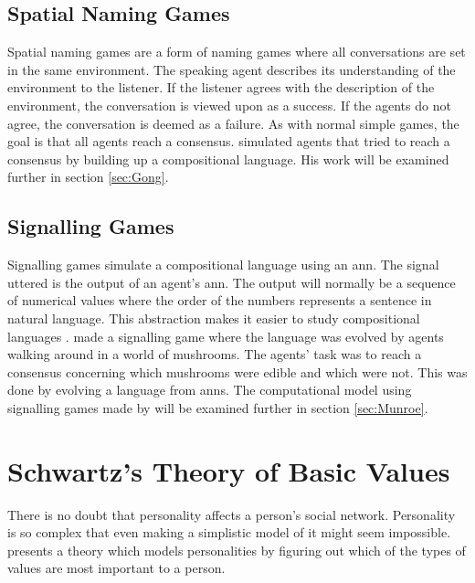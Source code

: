 \subsection{Spatial Naming Games}\label{SpatNamingGame}
Spatial naming games are a form of naming games where all conversations are set in the same environment. The speaking agent describes its understanding of the environment to the listener. If the listener agrees with the description of the environment, the conversation is viewed upon as a success. If the agents do not agree, the conversation is deemed as a failure. As with normal simple games, the goal is that all agents reach a consensus. \citeauthor{gong2011simulating} simulated agents that tried to reach a consensus by building up a compositional language. His work will be examined further in section \ref{sec:Gong}.

\subsection{Signalling Games}
Signalling games simulate a compositional language using an \ac{ann}. The signal uttered is the output of an agent's \ac{ann}. The output will normally be a sequence of numerical values where the order of the numbers represents a sentence in natural language. This abstraction makes it easier to study compositional languages \citep{munroe2002learning, suzuki2008learning}. \citeauthor{munroe2002learning} made a signalling game where the language was evolved by agents walking around in a world of mushrooms. The agents' task was to reach a consensus concerning which mushrooms were edible and which were not. This was done by evolving a language from \acp{ann}. The computational model using signalling games made by \citeauthor{munroe2002learning} will be examined further in section \ref{sec:Munroe}.


\section{Schwartz's Theory of Basic Values}\label{SchwartzBasicValues}
There is no doubt that personality affects a person's social network. Personality is so complex that even making a simplistic model of it might seem impossible. \citet{schwartz1992unniversals} presents a theory which models personalities by figuring out which of the types of values are most important to a person.

